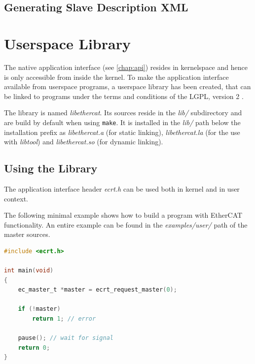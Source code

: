 \documentclass[a4paper,12pt,BCOR6mm,bibtotoc,idxtotoc]{scrbook}
\begin{document}



\subsection{Generating Slave Description XML}




\section{Userspace Library}
\label{sec:userlib}

The native application interface (see \autoref{chap:api}) resides in
kernelspace and hence is only accessible from inside the kernel. To make the
application interface available from userspace programs, a userspace library
has been created, that can be linked to programs under the terms and
conditions of the LGPL, version 2 \cite{lgpl}.

The library is named \textit{libethercat}. Its sources reside in the
\textit{lib/} subdirectory and are build by default when using
\lstinline+make+. It is installed in the \textit{lib/} path below the
installation prefix as \textit{libethercat.a} (for static linking),
\textit{libethercat.la} (for the use with \textit{libtool}) and
\textit{libethercat.so} (for dynamic linking).

\subsection{Using the Library}

The application interface header \textit{ecrt.h} can be used both in kernel
and in user context.

The following minimal example shows how to build a program with EtherCAT
functionality. An entire example can be found in the \textit{examples/user/}
path of the master sources.

\begin{lstlisting}[language=C]
#include <ecrt.h>

int main(void)
{
    ec_master_t *master = ecrt_request_master(0);

    if (!master)
        return 1; // error

    pause(); // wait for signal
    return 0;
}
\end{lstlisting}
\end{document}
